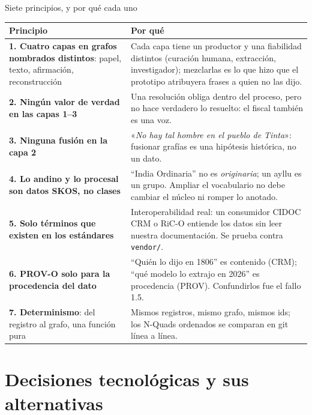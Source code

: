 \documentclass[aspectratio=169,10pt]{beamer}
\newcommand{\cita}[1]{«\textit{#1}»}
\newcommand{\ttt}[1]{\texttt{\small #1}}
\begin{document}
\begin{frame}{Siete principios, y por qué cada uno}
\scriptsize
\begin{tabular}{@{}p{5.4cm}p{7.8cm}@{}}
\toprule
Principio & Por qué \\
\midrule
\textbf{1. Cuatro capas en grafos nombrados distintos}: papel, texto, afirmación, reconstrucción &
Cada capa tiene un productor y una fiabilidad distintos (curación humana, extracción, investigador); mezclarlas es lo
que hizo que el prototipo atribuyera frases a quien no las dijo. \\
\textbf{2. Ningún valor de verdad en las capas 1--3} &
Una resolución obliga dentro del proceso, pero no hace verdadero lo resuelto: el fiscal también es una voz. \\
\textbf{3. Ninguna fusión en la capa 2} &
\cita{No hay tal hombre en el pueblo de Tinta}: fusionar grafías es una hipótesis histórica, no un dato. \\
\textbf{4. Lo andino y lo procesal son datos SKOS, no clases} &
\enquote{India Ordinaria} no es \emph{originaria}; un ayllu es un grupo. Ampliar el vocabulario no debe cambiar el núcleo
ni romper lo anotado. \\
\textbf{5. Solo términos que existen en los estándares} &
Interoperabilidad real: un consumidor CIDOC CRM o RiC-O entiende los datos sin leer nuestra documentación. Se prueba
contra \ttt{vendor/}. \\
\textbf{6. PROV-O solo para la procedencia del dato} &
\enquote{Quién lo dijo en 1806} es contenido (CRM); \enquote{qué modelo lo extrajo en 2026} es procedencia (PROV).
Confundirlos fue el fallo 1.5. \\
\textbf{7. Determinismo}: del registro al grafo, una función pura &
Mismos registros, mismo grafo, mismos ids; los N-Quads ordenados se comparan en git línea a línea. \\
\bottomrule
\end{tabular}
\end{frame}

\section{Decisiones tecnológicas y sus alternativas}
\end{document}
